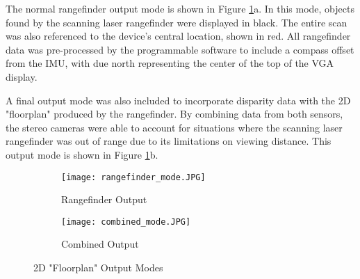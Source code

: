The normal rangefinder output mode is shown in Figure \ref{rangeOutputs}a. In this mode, objects found by the scanning laser rangefinder were displayed in black. The entire scan was also referenced to the device's central location, shown in red. All rangefinder data was pre-processed by the programmable software to include a compass offset from the IMU, with due north representing the center of the top of the VGA display.
\par 
A final output mode was also included to incorporate disparity data with the 2D "floorplan" produced by the rangefinder. By combining data from both sensors, the stereo cameras were able to account for situations where the scanning laser rangefinder was out of range due to its limitations on viewing distance. This output mode is shown in Figure \ref{rangeOutputs}b.

\begin{figure}[H] 
         \begin{subfigure}[h]{0.5\textwidth}
              \centerline{\texttt{[image: rangefinder\_mode.JPG]}}
             \caption{Rangefinder Output}
         \end{subfigure}
         \begin{subfigure}[h]{0.5\textwidth}
             \centerline{\texttt{[image: combined\_mode.JPG]}}
             \caption{Combined Output}
         \end{subfigure}
\caption{2D "Floorplan" Output Modes}
\label{rangeOutputs}
\end{figure}
